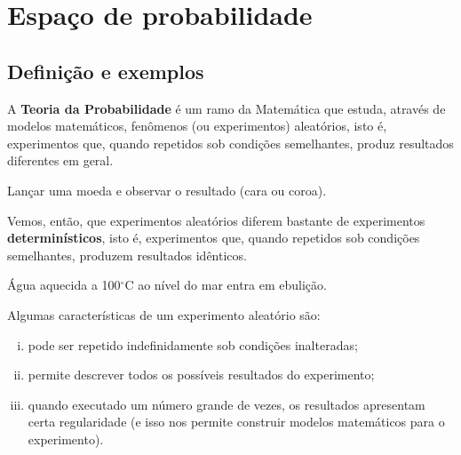\documentclass[../Notas.tex]{subfiles}
\begin{document}

\section{Espaço de probabilidade}

\subsection{Definição e exemplos}
A {\bf Teoria da Probabilidade} é um ramo da Matemática que estuda, através de modelos matemáticos, fenômenos (ou experimentos) aleatórios, isto é, experimentos que, quando repetidos sob condições semelhantes, produz resultados diferentes em geral.

\begin{example}
Lançar uma moeda e observar o resultado (cara ou coroa).
\end{example}

Vemos, então, que experimentos aleatórios diferem bastante de experimentos {\bf determinísticos}, isto é, experimentos que, quando repetidos sob condições semelhantes, produzem resultados idênticos.

\begin{example}
Água aquecida a 100$^\circ$C ao nível do mar entra em ebulição.
\end{example}

Algumas características de um experimento aleatório são:
\begin{enumerate}[i.]
    \item pode ser repetido indefinidamente sob condições inalteradas;
    \item permite descrever todos os possíveis resultados do experimento;
    \item quando executado um número grande de vezes, os resultados apresentam certa regularidade (e isso nos permite construir modelos matemáticos para o experimento).
\end{enumerate}
\end{document}
